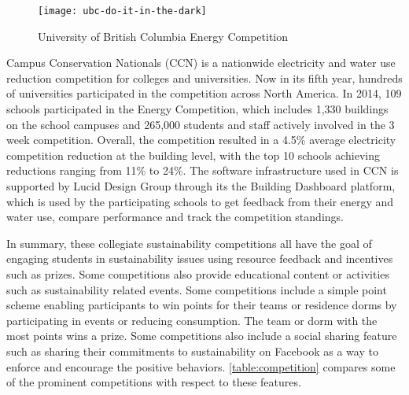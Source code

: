 \begin{figure}[ht!]
	\centering
		\texttt{[image: ubc-do-it-in-the-dark]}
		\caption{University of British Columbia Energy Competition\cite{runkle2011dark} }
		\label{fig:ubc-do-it-in-the-dark}
\end{figure}

Campus Conservation Nationals (CCN) \cite{competetoreduce} is a nationwide electricity and water use reduction competition for colleges and universities. Now in its fifth year, hundreds of universities participated in the competition across North America. In 2014, 109 schools participated in the Energy Competition, which includes 1,330 buildings on the school campuses and 265,000 students and staff actively involved in the 3 week competition. Overall, the competition resulted in a 4.5\% average electricity competition reduction at the building level, with the top 10 schools achieving reductions ranging from 11\% to 24\%. The software infrastructure used in CCN is supported by Lucid Design Group through its the Building Dashboard platform, which is used by the participating schools to get feedback from their energy and water use, compare performance and track the competition standings.

In summary, these collegiate sustainability competitions all have the goal of engaging students in sustainability issues using resource feedback and incentives such as prizes. Some competitions also provide educational content or activities such as  sustainability related events. Some competitions include a simple point scheme enabling participants to win points for their teams or residence dorms by participating in events or reducing consumption. The team or dorm with the most points wins a  prize. Some competitions also include a social sharing feature such as sharing their commitments to sustainability on Facebook as a way to enforce and encourage the positive behaviors.  \autoref{table:competition} compares some of the prominent competitions with respect to these features. 

